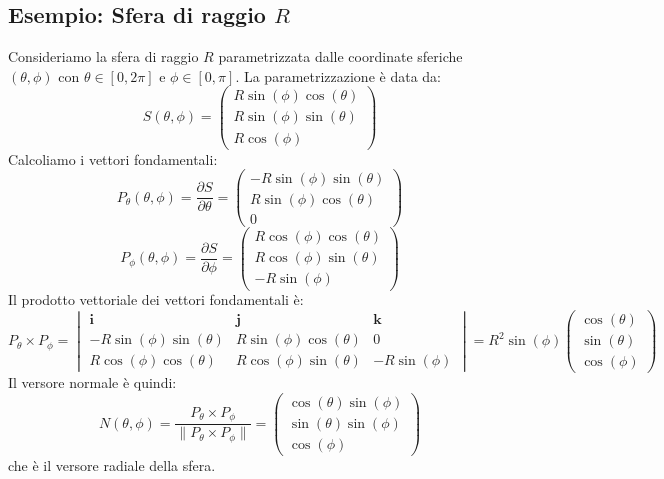 \subsection{Esempio: Sfera di raggio $R$}
  Consideriamo la sfera di raggio $R$ parametrizzata dalle coordinate sferiche $(\theta, \phi)$ con $\theta \in [0, 2\pi]$ e $\phi \in [0, \pi]$. La parametrizzazione è data da:
  \[
  S(\theta, \phi) = \begin{pmatrix}
    R \sin(\phi) \cos(\theta) \\
    R \sin(\phi) \sin(\theta) \\
    R \cos(\phi)
  \end{pmatrix}
  \]
  Calcoliamo i vettori fondamentali:
  \[
  P_\theta(\theta, \phi) = \frac{\partial S}{\partial \theta} = \begin{pmatrix}
    -R \sin(\phi) \sin(\theta) \\
    R \sin(\phi) \cos(\theta) \\
    0
  \end{pmatrix}
  \]
  \[
  P_\phi(\theta, \phi) = \frac{\partial S}{\partial \phi} = \begin{pmatrix}
    R \cos(\phi) \cos(\theta) \\
    R \cos(\phi) \sin(\theta) \\
    -R \sin(\phi)
  \end{pmatrix}
  \]
  Il prodotto vettoriale dei vettori fondamentali è:
  \[
  P_\theta \times P_\phi = \begin{vmatrix}
    \mathbf{i} & \mathbf{j} & \mathbf{k} \\
    -R \sin(\phi) \sin(\theta) & R \sin(\phi) \cos(\theta) & 0 \\
    R \cos(\phi) \cos(\theta) & R \cos(\phi) \sin(\theta) & -R \sin(\phi)
  \end{vmatrix}
  = R^2 \sin(\phi) \begin{pmatrix}
    \cos(\theta) \\
    \sin(\theta) \\
    \cos(\phi)
  \end{pmatrix}
  \]
  Il versore normale è quindi:
  \[
  N(\theta, \phi) = \frac{P_\theta \times P_\phi}{\|P_\theta \times P_\phi\|} = \begin{pmatrix}
    \cos(\theta) \sin(\phi) \\
    \sin(\theta) \sin(\phi) \\
    \cos(\phi)
  \end{pmatrix}
  \]
  che è il versore radiale della sfera.

